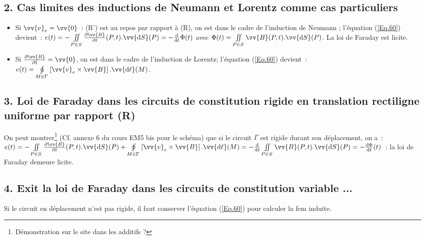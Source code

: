 \documentclass{article}
\let\oldiint\iint
\renewcommand{\iint}{\oldiint\limits}
\let\oldoint\oint
\renewcommand{\oint}{\oldoint\limits}
\renewcommand\overrightarrow{\vv}
\begin{document}
\subsection*{2. Cas limites des inductions de Neumann et Lorentz comme
cas particuliers}\begin{itemize}
\item Si $\overrightarrow{v}_{e} = \overrightarrow{0}$ : (R') est au
repos par rapport à (R), on est dans le cadre de l'induction de
Neumann ; l'équation (\ref{Eq.60}) devient : $e(t) = -\iint_{P\in
S}\frac{\partial\overrightarrow{B}}{\partial
t}(P,t).\overrightarrow{\mathrm{d}S}(P)= -\frac{\mathrm{d}}{\mathrm{d}t}\Phi(t)$ avec $\Phi(t)
= \iint_{P\in S}\overrightarrow{B}(P,t).\overrightarrow{\mathrm{d}S}(P)$. La
loi de Faraday est licite.
\item Si $\frac{\partial \overrightarrow{B}}{\partial t} =
\overrightarrow{0}$, on est dans le cadre de l'induction de Lorentz;
l'équation (\ref{Eq.60}) devient : $e(t) = \oint_{M\in
\Gamma}\left[\overrightarrow{v}_{e}\times
\overrightarrow{B}\right].\overrightarrow{\mathrm{d}\ell}(M)$.
\end{itemize}

\subsection*{3. Loi de Faraday dans les circuits de constitution rigide en translation rectiligne uniforme par rapport (R)}
On peut montrer\footnote{Démonstration sur le site dans les additifs
?} (Cf. annexe 6 du cours EM5 bis pour le schéma) que si le circuit
$\Gamma$ est rigide durant son déplacement, on a : $e(t) =
-\iint_{P\in S}\frac{\partial\overrightarrow{B}}{\partial
t}(P,t).\overrightarrow{\mathrm{d}S}(P) +\oint_{M\in
\Gamma}\left[\overrightarrow{v}_{e}\times
\overrightarrow{B}\right].\overrightarrow{\mathrm{d}\ell}(M) =
-\frac{\mathrm{d}}{\mathrm{d}t}\iint_{P\in
S}\overrightarrow{B}(P,t).\overrightarrow{\mathrm{d}S}(P) = -\frac{\mathrm{d}\Phi}{\mathrm{d}t}(t)$ : la loi de Faraday demeure licite.

\subsection*{4. Exit la loi de Faraday dans les circuits de constitution
variable ...}
Si le circuit en déplacement n'est pas rigide, il faut conserver
l'équation (\ref{Eq.60}) pour calculer la fem induite.
\end{document}
